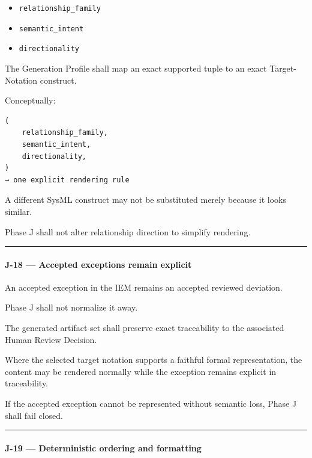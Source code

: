 \begin{itemize}
\tightlist
\item
  \texttt{relationship\_family}
\item
  \texttt{semantic\_intent}
\item
  \texttt{directionality}
\end{itemize}

The Generation Profile shall map an exact supported tuple to an exact Target-Notation construct.

Conceptually:

\begin{verbatim}
(
    relationship_family,
    semantic_intent,
    directionality,
)
→ one explicit rendering rule
\end{verbatim}

A different SysML construct may not be substituted merely because it looks similar.

Phase J shall not alter relationship direction to simplify rendering.

\begin{center}\rule{0.5\linewidth}{0.5pt}\end{center}

\hypertarget{j-18--accepted-exceptions-remain-explicit}{%
\paragraph{J-18 --- Accepted exceptions remain explicit}\label{j-18--accepted-exceptions-remain-explicit}}

An accepted exception in the IEM remains an accepted reviewed deviation.

Phase J shall not normalize it away.

The generated artifact set shall preserve exact traceability to the associated Human Review Decision.

Where the selected target notation supports a faithful formal representation, the content may be rendered normally while the exception remains explicit in traceability.

If the accepted exception cannot be represented without semantic loss, Phase J shall fail closed.

\begin{center}\rule{0.5\linewidth}{0.5pt}\end{center}

\hypertarget{j-19--deterministic-ordering-and-formatting}{%
\paragraph{J-19 --- Deterministic ordering and formatting}\label{j-19--deterministic-ordering-and-formatting}}


